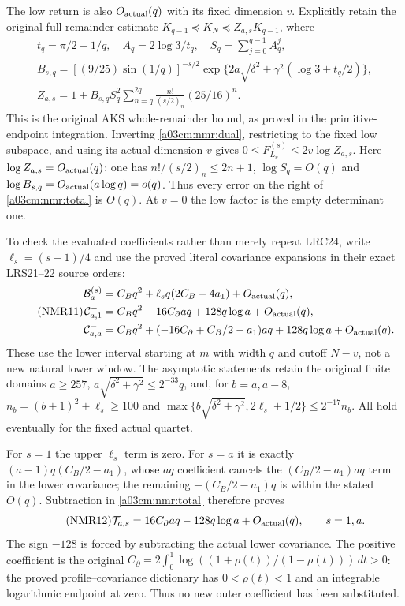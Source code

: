The low return is also $O_{\rm actual}(q)$ with its fixed dimension
$v$. Explicitly retain the original full-remainder estimate
$K_{q-1}\preceq K_N\preceq Z_{a,s}K_{q-1}$, where
\begin{equation}\tag{NMR10}\label{a03cm:nmr:Z}
\begin{gathered}
t_q=\pi/2-1/q,\quad A_q=2\log3/t_q,\quad
S_q=\sum_{j=0}^{q-1}A_q^j,\\
B_{s,q}=[(9/25)\sin(1/q)]^{-s/2}
        \exp\{2a\sqrt{\delta^2+\gamma^2}(\log3+t_q/2)\},\\
Z_{a,s}=1+B_{s,q}S_q^2
           \sum_{n=q}^{2q}\frac{n!}{(s/2)_n}(25/16)^n .
\end{gathered}
\end{equation}
This is the original AKS whole-remainder bound, as proved in the
primitive-endpoint integration. Inverting \eqref{a03cm:nmr:dual},
restricting to the fixed low subspace, and using its actual dimension
$v$ gives $0\leq F_{L_v}^{(s)}\leq2v\log Z_{a,s}$.
Here $\log Z_{a,s}=O_{\rm actual}(q)$: one has
$n!/(s/2)_n\leq2n+1$, $\log S_q=O(q)$ and
$\log B_{s,q}=O_{\rm actual}(a\log q)=o(q)$.
Thus every error on the right of \eqref{a03cm:nmr:total} is $O(q)$.
At $v=0$ the low factor is the empty determinant one.

To check the evaluated coefficients rather than merely repeat LRC24,
write $\ell_s=(s-1)/4$ and use the proved literal covariance
expansions in their exact LRS21--22 source orders:
\begin{equation}\tag{NMR11}\label{a03cm:nmr:covariances}
\begin{aligned}
\mathcal B_a^{(s)}
 &=C_Bq^2+\ell_sq(2C_B-4a_1)+O_{\rm actual}(q),\\
\mathcal C^-_{a,1}
 &=C_Bq^2-16C_\partial aq+128q\log a+O_{\rm actual}(q),\\
\mathcal C^-_{a,a}
 &=C_Bq^2+(-16C_\partial+C_B/2-a_1)aq
                  +128q\log a+O_{\rm actual}(q).
\end{aligned}
\end{equation}
These use the lower interval starting at $m$ with width $q$ and
cutoff $N-v$, not a new natural lower window. The asymptotic
statements retain the original finite domains
$a\geq257$,
$a\sqrt{\delta^2+\gamma^2}\leq2^{-33}q$, and, for $b=a,a-8$,
$n_b=(b+1)^2+\ell_s\geq100$ and
$\max\{b\sqrt{\delta^2+\gamma^2},2\ell_s+1/2\}\leq2^{-17}n_b$.
All hold eventually for the fixed actual quartet.

For $s=1$ the upper $\ell_s$ term is zero. For $s=a$ it is exactly
$(a-1)q(C_B/2-a_1)$, whose $aq$ coefficient cancels the
$(C_B/2-a_1)aq$ term in the lower covariance; the remaining
$-(C_B/2-a_1)q$ is within the stated $O(q)$.
Subtraction in \eqref{a03cm:nmr:total} therefore proves
\begin{equation}\tag{NMR12}\label{a03cm:nmr:native-value}
\mathcal T_{a,s}
=16C_\partial aq-128q\log a+O_{\rm actual}(q),
\qquad s=1,a .
\end{equation}
The sign $-128$ is forced by subtracting the actual lower covariance.
The positive coefficient is the original
$C_\partial=2\int_0^1\log((1+\rho(t))/(1-\rho(t)))\,dt>0$:
the proved profile--covariance dictionary has
$0<\rho(t)<1$ and an integrable logarithmic endpoint at zero.
Thus no new outer coefficient has been substituted.

